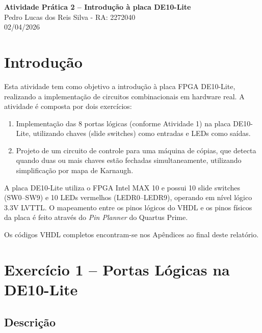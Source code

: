 \documentclass[12pt,a4paper, brazil]{article}
\begin{document}
\begin{center}
{\textbf {\huge Atividade Prática 2 -- Introdução à placa DE10-Lite}}\\[5mm]
{\large Pedro Lucas dos Reis Silva - RA: 2272040} \\[5mm]
02/04/2026\\[5mm]
\end{center}

\section{Introdução}

Esta atividade tem como objetivo a introdução à placa FPGA DE10-Lite, realizando a implementação de circuitos combinacionais em hardware real. A atividade é composta por dois exercícios:

\begin{enumerate}
    \item Implementação das 8 portas lógicas (conforme Atividade 1) na placa DE10-Lite, utilizando chaves (slide switches) como entradas e LEDs como saídas.
    \item Projeto de um circuito de controle para uma máquina de cópias, que detecta quando duas ou mais chaves estão fechadas simultaneamente, utilizando simplificação por mapa de Karnaugh.
\end{enumerate}

A placa DE10-Lite utiliza o FPGA Intel MAX 10 e possui 10 slide switches (SW0--SW9) e 10 LEDs vermelhos (LEDR0--LEDR9), operando em nível lógico 3.3V LVTTL. O mapeamento entre os pinos lógicos do VHDL e os pinos físicos da placa é feito através do \textit{Pin Planner} do Quartus Prime.

Os códigos VHDL completos encontram-se nos Apêndices ao final deste relatório.

\section{Exercício 1 -- Portas Lógicas na DE10-Lite}

\subsection{Descrição}
\end{document}
